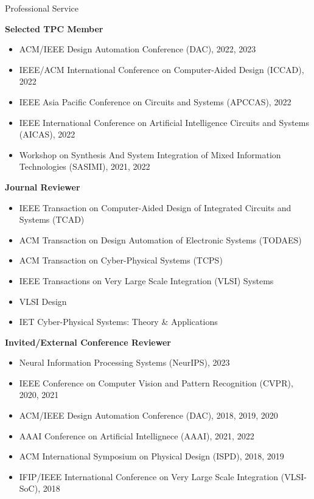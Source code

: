 
\begin{rSection}{Professional Service}

\textbf{Selected TPC Member}
\begin{itemize}
    \item ACM/IEEE Design Automation Conference (DAC), 2022, 2023
    \item IEEE/ACM International Conference on Computer-Aided Design (ICCAD), 2022
    \item IEEE Asia Pacific Conference on Circuits and Systems (APCCAS), 2022
    \item IEEE International Conference on Artificial Intelligence Circuits and Systems (AICAS), 2022
    \item Workshop on Synthesis And System Integration of Mixed Information Technologies (SASIMI), 2021, 2022
\end{itemize}


\textbf{Journal Reviewer}
\begin{itemize}
    \item IEEE Transaction on Computer-Aided Design of Integrated Circuits and Systems (TCAD)
    \item ACM Transaction on Design Automation of Electronic Systems (TODAES)
    \item ACM Transaction on Cyber-Physical Systems (TCPS)
    \item IEEE Transactions on Very Large Scale Integration (VLSI) Systems
    \item VLSI Design
    \item IET Cyber-Physical Systems: Theory \& Applications
\end{itemize}

\textbf{Invited/External Conference Reviewer}
\begin{itemize}
    \item Neural Information Processing Systems (NeurIPS), 2023
    \item IEEE Conference on Computer Vision and Pattern Recognition (CVPR), 2020, 2021
    \item ACM/IEEE Design Automation Conference (DAC), 2018, 2019, 2020
    \item AAAI Conference on Artificial Intellignece (AAAI), 2021, 2022
    \item ACM International Symposium on Physical Design (ISPD), 2018, 2019
    \item IFIP/IEEE International Conference on Very Large Scale Integration (VLSI-SoC), 2018
\end{itemize}
\end{rSection}


